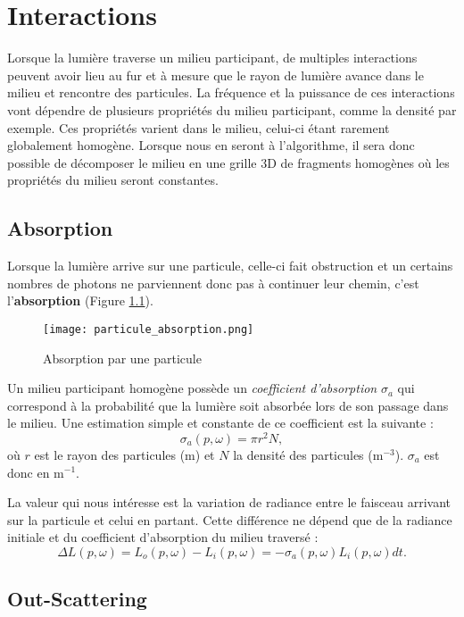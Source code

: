 \chapter{Interactions}

Lorsque la lumière traverse un milieu participant, de multiples interactions peuvent avoir lieu au fur et à mesure que le rayon de lumière avance dans le milieu et rencontre des particules. La fréquence et la puissance de ces interactions vont dépendre de plusieurs propriétés du milieu participant, comme la densité par exemple. Ces propriétés varient dans le milieu, celui-ci étant rarement globalement homogène. Lorsque nous en seront à l'algorithme, il sera donc possible de décomposer le milieu en une grille 3D de fragments homogènes où les propriétés du milieu seront constantes.

\section{Absorption}

Lorsque la lumière arrive sur une particule, celle-ci fait obstruction et un certains nombres de photons ne parviennent donc pas à continuer leur chemin, c'est l'\textbf{absorption} (Figure \ref{fig:absorption}).

\begin{figure}[h!]\label{fig:absorption}
\centering
\texttt{[image: particule\_absorption.png]}
\caption{Absorption par une particule}
\end{figure}

Un milieu participant homogène possède un \textit{coefficient d'absorption} $\sigma_{a}$ qui correspond à la probabilité que la lumière soit absorbée lors de son passage dans le milieu. Une estimation simple et constante de ce coefficient est la suivante :
\large
$$\sigma_{a}(p, \omega) = \pi r^{2} N,$$
\normalsize
où $r$ est le rayon des particules (m) et $N$ la densité des particules (m$^{-3}$). $\sigma_{a}$ est donc en m$^{-1}$.

La valeur qui nous intéresse est la variation de radiance entre le faisceau arrivant sur la particule et celui en partant. Cette différence ne dépend que de la radiance initiale et du coefficient d'absorption du milieu traversé :
\large
\begin{equation}
    \Delta L(p, \omega) = L_{o}(p, \omega) - L_{i}(p, \omega) = -\sigma_{a}(p, \omega)L_{i}(p, \omega)dt
.\end{equation}
\normalsize

\section{Out-Scattering}

